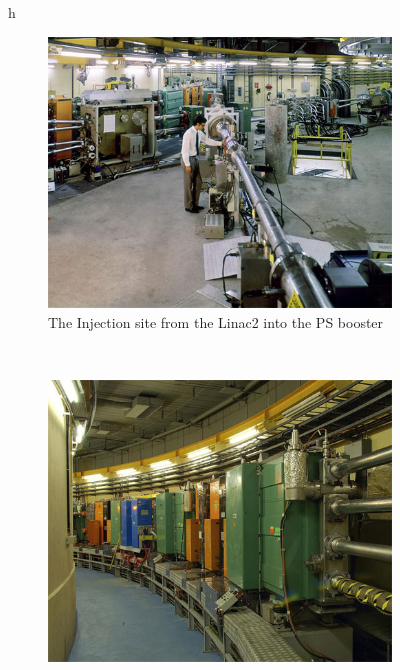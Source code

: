 \begin{figure}{h}
    \centering
    \begin{subfigure}[h]{0.4\textwidth}
        \includegraphics[width=\textwidth]{Figures/LHC_Diagrams/LHC__PSbooster__psb_injection.jpg}
        \caption{The Injection site from the Linac2 into the PS booster
        \cite{LHC:LHC_psbooster_injection_image}}\label{fig:linac2_to_psbooster_injection}
      \end{subfigure}
      ~ %
      \begin{subfigure}[h]{0.4\textwidth}
        \includegraphics[width=\textwidth]{Figures/LHC_Diagrams/LHC__PSbooster__psb_4_beamLines_shown.jpg}

\end{subfigure}
\end{figure}
